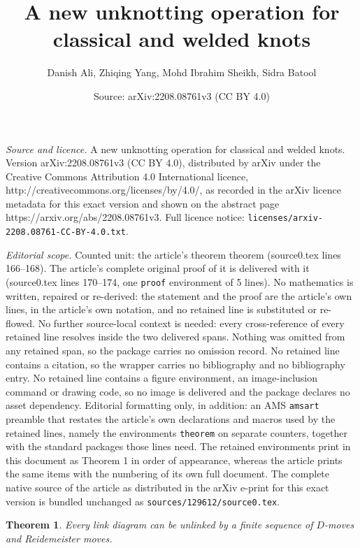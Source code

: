 \documentclass[10pt,a4paper]{amsart}
\title{A new unknotting operation for classical and welded knots}
\author{Danish Ali, Zhiqing Yang, Mohd Ibrahim Sheikh, Sidra Batool}
\date{Source: arXiv:2208.08761v3 (CC BY 4.0)}
\newtheorem{theorem}{Theorem}
\begin{document}
\maketitle

\noindent\emph{Source and licence.} A new unknotting operation for classical and welded knots. Version arXiv:2208.08761v3 (CC BY 4.0), distributed by arXiv under the Creative Commons Attribution 4.0 International licence, http://creativecommons.org/licenses/by/4.0/, as recorded in the arXiv licence metadata for this exact version and shown on the abstract page https://arxiv.org/abs/2208.08761v3. Full licence notice: \texttt{licenses/arxiv-2208.08761-CC-BY-4.0.txt}.\par\smallskip

\noindent\textit{Editorial scope.} Counted unit: the article's theorem theorem (source0.tex lines 166--168). The article's complete original proof of it is delivered with it (source0.tex lines 170--174, one \texttt{proof} environment of 5 lines). No mathematics is written, repaired or re-derived: the statement and the proof are the article's own lines, in the article's own notation, and no retained line is substituted or re-flowed.  No further source-local context is needed: every cross-reference of every retained line resolves inside the two delivered spans.  Nothing was omitted from any retained span, so the package carries no omission record.  No retained line contains a citation, so the wrapper carries no bibliography and no bibliography entry.  No retained line contains a figure environment, an image-inclusion command or drawing code, so no image is delivered and the package declares no asset dependency.  Editorial formatting only, in addition: an AMS \texttt{amsart} preamble that restates the article's own declarations and macros used by the retained lines, namely the environments \texttt{theorem} on separate counters, together with the standard packages those lines need.  The retained environments print in this document as Theorem 1 in order of appearance, whereas the article prints the same items with the numbering of its own full document.  The complete native source of the article as distributed in the arXiv e-print for this exact version is bundled unchanged as \texttt{sources/129612/source0.tex}.
\begin{theorem}
 Every link diagram can be unlinked by a finite sequence of $D$-moves and Reidemeister moves.
\end{theorem}
\end{document}
